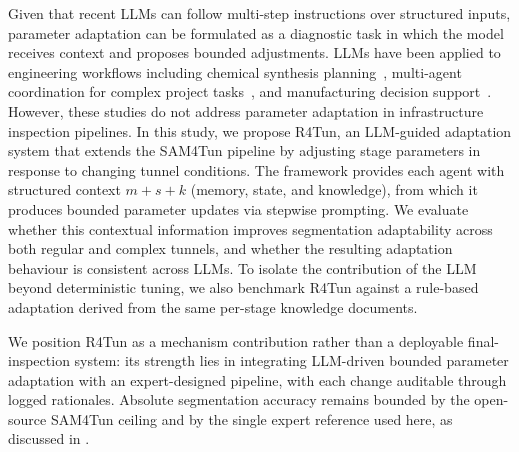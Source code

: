 \documentclass[a4paper,fleqn]{cas-dc}
\begin{document}
{Given that recent LLMs can follow multi-step instructions over structured inputs, parameter adaptation can be formulated as a diagnostic task in which the model receives context and proposes bounded adjustments. LLMs have been applied to engineering workflows including chemical synthesis planning~\citep{bran2024chemcrow}, multi-agent coordination for complex project tasks~\citep{qian2024chatdev, hong2024metagpt, chen2024comm}, and manufacturing decision support~\citep{garcia2024manufacturing}. However, these studies do not address parameter adaptation in infrastructure inspection pipelines. In this study, we propose R4Tun, an LLM-guided adaptation system that extends the SAM4Tun pipeline by adjusting stage parameters in response to changing tunnel conditions. The framework provides each agent with structured context $m+s+k$ (memory, state, and knowledge), from which it produces bounded parameter updates via stepwise prompting. We evaluate whether this contextual information improves segmentation adaptability across both regular and complex tunnels, and whether the resulting adaptation behaviour is consistent across LLMs. To isolate the contribution of the LLM beyond deterministic tuning, we also benchmark R4Tun against a rule-based adaptation derived from the same per-stage knowledge documents.

We position R4Tun as a mechanism contribution rather than a deployable final-inspection system: its strength lies in integrating LLM-driven bounded parameter adaptation with an expert-designed pipeline, with each change auditable through logged rationales. Absolute segmentation accuracy remains bounded by the open-source SAM4Tun ceiling and by the single expert reference used here, as discussed in .

}
\end{document}
